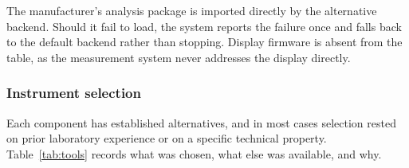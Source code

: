 The manufacturer's analysis package is imported directly by the
alternative backend. Should it fail to load, the system reports
the failure once and falls back to the default backend rather than
stopping. Display firmware is absent from the table, as the
measurement system never addresses the display directly.

\subsubsection{Instrument selection}
\label{sec:tools}

Each component has established alternatives, and in most cases
selection rested on prior laboratory experience or on a specific
technical property.
Table~\ref{tab:tools} records what was chosen, what else was
available, and why.

